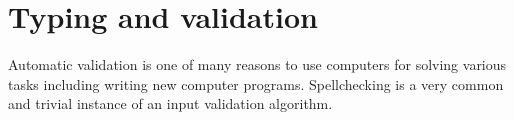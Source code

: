 \documentclass[11pt,oneside,a4paper]{report}
\begin{document}
\chapter{Typing and validation}
Automatic validation is one of many reasons to use computers for solving various tasks including writing new computer programs.
Spellchecking is a very common and trivial instance of an input validation algorithm. 


\end{document}
